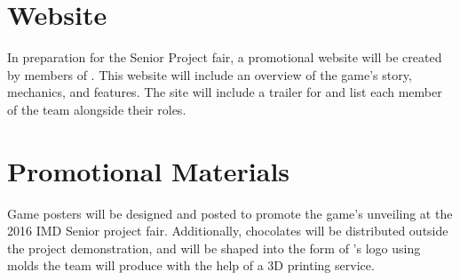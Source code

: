 \section{Website}
In preparation for the Senior Project fair, a promotional website will be created by members of \ourteam{}. This website will include an overview of the game's story, mechanics, and features. The site will include a trailer for \ourgame{} and list each member of the team alongside their roles.

\section{Promotional Materials}
Game posters will be designed and posted to promote the game's unveiling at the 2016 IMD Senior project fair. Additionally, chocolates will be distributed outside the project demonstration, and will be shaped into the form of \ourteam{}'s logo using molds the team will produce with the help of a 3D printing service.